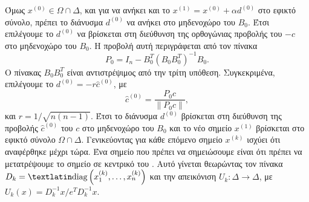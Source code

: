 Όμως \( x^{(0)} \in \Omega \cap \Delta \), και για να ανήκει και το \( x^{(1)} =
x^{(0)} + \alpha d^{(0)} \) στο εφικτό σύνολο, πρέπει το διάνυσμα \( d^{(0)} \)
να ανήκει στο μηδενοχώρο του \( B_0\). Έτσι επιλέγουμε το \( d^{(0)} \) να
βρίσκεται στη διεύθυνση της ορθογώνιας προβολής του \( -c \) στο μηδενοχώρο του
\( B_0 \). Η προβολή αυτή περιγράφεται από τον πίνακα
\begin{equation*}
    P_0 = I_n - B_0^T(B_0B_0^T)^{-1}B_0.
\end{equation*}
Ο πίνακας \( B_0B_0^T \) είναι αντιστρέψιμος από την τρίτη υπόθεση.
Συγκεκριμένα, επιλέγουμε το \( d^{(0)}  = -r\hat{c}^{(0)} \), με
\begin{equation*}
    \hat{c}^{(0)} = \frac{P_0c}{\|P_0c\|},
\end{equation*}
και \( r = 1/ \sqrt{n(n - 1)} \). Έτσι το διάνυσμα \( d^{(0)} \) βρίσκεται στη
διεύθυνση της προβολής \( \hat{c}^{(0)} \) του \( c \) στο μηδενοχώρο του \( B_0
\) και το νέο σημείο \( x^{(1)} \) βρίσκεται στο εφικτό σύνολο \( \Omega \cap
\Delta \). Γενικεύοντας για κάθε επόμενο σημείο \( x^{(k)} \) ισχύει ότι
αναφέρθηκε μέχρι τώρα. Ένα σημείο που πρέπει να σημειώσουμε είναι ότι πρέπει να
μετατρέψουμε το σημείο σε κεντρικό του . Αυτό γίνεται θεωρώντας τον
πίνακα \( D_k = \mathtxt{diag}\left( x_1^{(k)}, \dots, x_n^{(k)} \right) \) και
την απεικόνιση \( U_k: \Delta \to \Delta \), με \( U_k(x) =
D_k^{-1}x/e^TD_k^{-1}x \).

